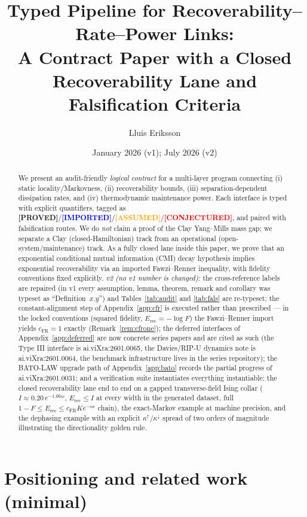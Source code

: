\documentclass[11pt]{article}
\title{Typed Pipeline for Recoverability--Rate--Power Links:\\
\large A Contract Paper with a Closed Recoverability Lane and
Falsification Criteria}
\author{Lluis Eriksson}
\date{January 2026 (v1); July 2026 (v2)}
\theoremstyle{definition}
\theoremstyle{remark}
\newcommand{\ASSUMED}{\textcolor{orange}{\textbf{[ASSUMED]}}}
\newcommand{\PROVED}{\textcolor{green!60!black}{\textbf{[PROVED]}}}
\newcommand{\IMPORTED}{\textcolor{blue}{\textbf{[IMPORTED]}}}
\newcommand{\CONJ}{\textcolor{red}{\textbf{[CONJECTURED]}}}
\newcommand{\Erec}{E_{\mathrm{rec}}}
\begin{document}
\maketitle

\begin{abstract}
We present an audit-friendly \emph{logical contract} for a multi-layer
program connecting (i) static locality/Markovness, (ii) recoverability
bounds, (iii) separation-dependent dissipation rates, and (iv)
thermodynamic maintenance power. Each interface is typed with explicit
quantifiers, tagged as
\PROVED/\IMPORTED/\ASSUMED/\CONJ, and paired with falsification routes.
We do \emph{not} claim a proof of the Clay Yang--Mills mass gap; we
separate a Clay (closed-Hamiltonian) track from an operational
(open-system/maintenance) track. As a fully closed lane inside this
paper, we prove that an exponential conditional mutual information (CMI)
decay hypothesis implies exponential recoverability via an imported
Fawzi--Renner inequality, with fidelity conventions fixed explicitly.
\emph{v2 (no v1 number is changed):} the cross-reference labels are
repaired (in v1 every assumption, lemma, theorem, remark and corollary
was typeset as ``Definition~$x.y$'') and Tables~\ref{tab:audit} and
\ref{tab:fals} are re-typeset; the constant-alignment step of
Appendix~\ref{app:cfr} is executed rather than prescribed --- in the
locked conventions (squared fidelity, $\Erec = -\log F$) the
Fawzi--Renner import yields $c_{\mathrm{FR}} = 1$ exactly
(Remark~\ref{rem:cfrone}); the deferred interfaces of
Appendix~\ref{app:deferred} are now concrete series papers and are cited
as such (the Type III interface is ai.viXra:2601.0065, the
Davies/RIP-U dynamics note is ai.viXra:2601.0064, the benchmark
infrastructure lives in the series repository); the BATO-LAW upgrade
path of Appendix~\ref{app:bato} records the partial progress of
ai.viXra:2601.0031; and a verification suite instantiates everything
instantiable: the closed recoverability lane end to end on a gapped transverse-field
Ising collar ($I \approx 0.20\,e^{-1.06 w}$, $\Erec \le I$ at every
width in the generated dataset, full $1 - F \le \Erec \le
c_{\mathrm{FR}} K e^{-\alpha\epsilon}$ chain), the exact-Markov example
at machine precision, and the dephasing example with an explicit
$\kappa^{\uparrow}/\kappa^{\downarrow}$ spread of two orders of
magnitude illustrating the directionality golden rule.
\end{abstract}

\section{Positioning and related work (minimal)}
\end{document}
